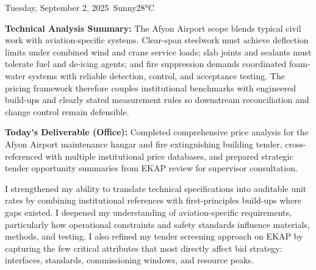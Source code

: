 \begin{dailyentry}{Tuesday, September 2, 2025}{\weathersunny\ Sunny}{28°C}
\begin{workcontent}
\begin{center}
\end{center}

\textbf{Technical Analysis Summary:} The Afyon Airport scope blends typical civil work with aviation-specific systems. Clear-span steelwork must achieve deflection limits under combined wind and crane service loads; slab joints and sealants must tolerate fuel and de-icing agents; and fire suppression demands coordinated foam-water systems with reliable detection, control, and acceptance testing. The pricing framework therefore couples institutional benchmarks with engineered build-ups and clearly stated measurement rules so downstream reconciliation and change control remain defensible.

\textbf{Today's Deliverable (Office):} Completed comprehensive price analysis for the Afyon Airport maintenance hangar and fire extinguishing building tender, cross-referenced with multiple institutional price databases, and prepared strategic tender opportunity summaries from EKAP review for supervisor consultation.
\end{workcontent}

\begin{skillslearned}
\item[] I strengthened my ability to translate technical specifications into auditable unit rates by combining institutional references with first-principles build-ups where gaps existed. I deepened my understanding of aviation-specific requirements, particularly how operational constraints and safety standards influence materials, methods, and testing. I also refined my tender screening approach on EKAP by capturing the few critical attributes that most directly affect bid strategy: interfaces, standards, commissioning windows, and resource peaks.
\end{skillslearned}


\end{dailyentry}
